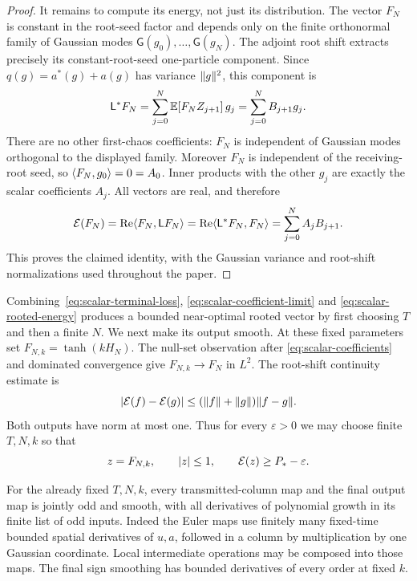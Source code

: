 \begin{proof}
It remains to compute its energy, not just its distribution.
The vector $F_N$ is constant in the root-seed factor and depends
only on the finite orthonormal family of Gaussian modes
$\mathsf G(g_0),\ldots,\mathsf G(g_N)$.
The adjoint root shift extracts precisely its constant-root-seed
one-particle component. Since $q(g)=a^*(g)+a(g)$ has variance
$\lVert g\rVert^2$, this component is
\[
 \mathsf L^*F_N=\sum_{j=0}^N\mathbb E[F_NZ_{j+1}]\,g_j
        =\sum_{j=0}^N B_{j+1}g_j.
\]
There are no other first-chaos coefficients: $F_N$ is independent
of Gaussian modes orthogonal to the displayed family.
Moreover $F_N$ is independent of the receiving-root seed, so
$\langle F_N,g_0\rangle=0=A_0$. Inner products with the other $g_j$
are exactly the scalar coefficients $A_j$. All vectors are real,
and therefore
\[
 \mathcal E(F_N)=\operatorname{Re}\langle F_N,\mathsf L F_N\rangle
        =\operatorname{Re}\langle \mathsf L^*F_N,F_N\rangle
        =\sum_{j=0}^N A_jB_{j+1}.
\]
This proves the claimed identity, with the Gaussian variance and
root-shift normalizations used throughout the paper.
\end{proof}

Combining~\eqref{eq:scalar-terminal-loss},
\eqref{eq:scalar-coefficient-limit} and
\eqref{eq:scalar-rooted-energy} produces a bounded near-optimal
rooted vector by first choosing $T$ and then a finite $N$.
We next make its output smooth. At these fixed parameters set
$F_{N,k}=\tanh(kH_N)$. The null-set observation after
\eqref{eq:scalar-coefficients} and dominated convergence give
$F_{N,k}\to F_N$ in $L^2$. The root-shift continuity estimate is
\begin{equation}
 |\mathcal E(f)-\mathcal E(g)|
 \le(\lVert f\rVert+\lVert g\rVert)\lVert f-g\rVert.
 \label{eq:energy-l2-continuity}
\end{equation}
Both outputs have norm at most one. Thus for every
$\varepsilon>0$ we may choose finite $T,N,k$ so that
\begin{equation}
 z=F_{N,k},\qquad |z|\le1,\qquad
 \mathcal E(z)\ge P_*-\varepsilon.
 \label{eq:scalar-near-optimal-smooth}
\end{equation}

For the already fixed $T,N,k$, every transmitted-column map and
the final output map is jointly odd and smooth, with all
derivatives of polynomial growth in its finite list of odd
inputs. Indeed the Euler maps use finitely many fixed-time
bounded spatial derivatives of $u,a$, followed in a column by
multiplication by one Gaussian coordinate. Local intermediate
operations may be composed into those maps. The final sign
smoothing has bounded derivatives of every order at fixed $k$.

